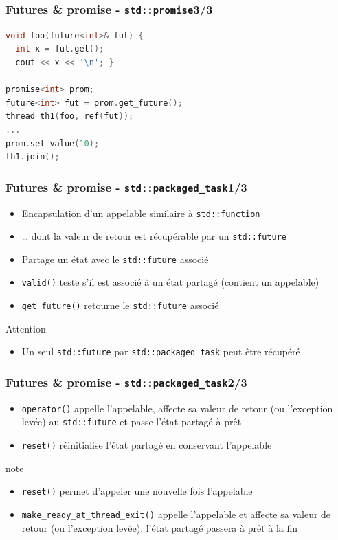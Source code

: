\documentclass[C++.tex]{subfiles}
\begin{document}
\begin{frame}[fragile]
	\frametitle{Futures \& promise - \lstinline|std::promise|\titlehfill{}3/3}
	\begin{lstlisting}[language=C++]
void foo(future<int>& fut) {
  int x = fut.get();
  cout << x << '\n'; }

promise<int> prom;
future<int> fut = prom.get_future();
thread th1(foo, ref(fut));
...
prom.set_value(10);
th1.join();\end{lstlisting}
\end{frame}

\begin{frame}[fragile]
	\frametitle{Futures \& promise - \lstinline|std::packaged_task|\titlehfill{}1/3}
	\begin{itemize}
		\item Encapsulation d'un appelable similaire à \lstinline|std::function|
		\item \ldots{} dont la valeur de retour est récupérable par un \lstinline|std::future|
		\item Partage un état avec le \lstinline|std::future| associé
		\item \lstinline|valid()| teste s'il est associé à un état partagé (contient un appelable)
		\item \lstinline|get_future()| retourne le \lstinline|std::future| associé
	\end{itemize}

	\begin{alertblock}{Attention}
		\begin{itemize}
			\item Un seul \lstinline|std::future| par \lstinline|std::packaged_task| peut être récupéré
		\end{itemize}
	\end{alertblock}
\end{frame}

\begin{frame}[fragile]
	\frametitle{Futures \& promise - \lstinline|std::packaged_task|\titlehfill{}2/3}
	\begin{itemize}
		\item \lstinline|operator()| appelle l'appelable, affecte sa valeur de retour (ou l'exception levée) au \lstinline|std::future| et passe l'état partagé à prêt
		\item \lstinline|reset()| réinitialise l'état partagé en conservant l'appelable
	\end{itemize}

	\begin{block}{note}
		\begin{itemize}
			\item \lstinline|reset()| permet d'appeler une nouvelle fois l'appelable
		\end{itemize}
	\end{block}

	\begin{itemize}
		\item \lstinline|make_ready_at_thread_exit()| appelle l'appelable et affecte sa valeur de retour (ou l'exception levée), l'état partagé passera à prêt à la fin
	\end{itemize}
\end{frame}
\end{document}
